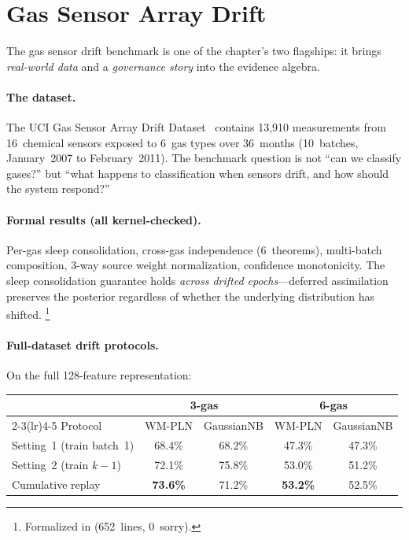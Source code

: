 \documentclass[11pt,openany]{report}
\begin{document}
\section{Gas Sensor Array Drift}
\label{sec:gas-drift}

The gas sensor drift benchmark is one of the chapter's two
flagships: it brings \emph{real-world data} and a \emph{governance
story} into the evidence algebra.

\paragraph{The dataset.}
The UCI Gas Sensor Array Drift
Dataset~\cite{Vergara2012GasSensorDrift} contains 13,910
measurements from 16~chemical sensors exposed to 6~gas types over
36~months (10~batches, January~2007 to February~2011).  The
benchmark question is not ``can we classify gases?'' but ``what
happens to classification when sensors drift, and how should the
system respond?''

\paragraph{Formal results (all kernel-checked).}
Per-gas sleep consolidation, cross-gas independence (6~theorems),
multi-batch composition, 3-way source weight normalization,
confidence monotonicity.  The sleep consolidation guarantee holds
\emph{across drifted epochs}---deferred assimilation preserves the
posterior regardless of whether the underlying distribution has
shifted.%
\footnote{Formalized in
 (652~lines,
0~sorry).}

\paragraph{Full-dataset drift protocols.}
On the full 128-feature representation:

\begin{center}
\footnotesize
\begin{tabular}{lcccc}
\toprule
& \multicolumn{2}{c}{3-gas} & \multicolumn{2}{c}{6-gas} \\
\cmidrule(lr){2-3}\cmidrule(lr){4-5}
Protocol & WM-PLN & GaussianNB & WM-PLN & GaussianNB \\
\midrule
Setting~1 (train batch~1) & 68.4\% & 68.2\% & 47.3\% & 47.3\% \\
Setting~2 (train $k{-}1$) & 72.1\% & 75.8\% & 53.0\% & 51.2\% \\
Cumulative replay & \textbf{73.6\%} & 71.2\% & \textbf{53.2\%} & 52.5\% \\
\bottomrule
\end{tabular}
\end{center}
\end{document}
